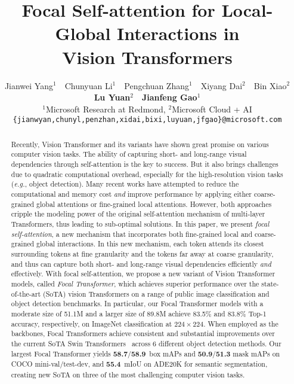 \documentclass{article}
\title{Focal Self-attention for Local-Global Interactions in \\ Vision Transformers}
\author{Jianwei Yang$^{1}$ \,\, Chunyuan Li$^{1}$ \,\, Pengchuan Zhang$^{1}$ \,\, Xiyang Dai$^{2}$ \,\, Bin Xiao$^{2}$ \\ 
  \textbf{Lu Yuan}$^{2}$ \,\, \textbf{Jianfeng Gao}$^{1}$ \\
  $^1$Microsoft Research at Redmond, $^2$Microsoft Cloud + AI\\
  \texttt{\{jianwyan,chunyl,penzhan,xidai,bixi,luyuan,jfgao\}@microsoft.com} \\
}
\newcommand{\cocominivalboxmapms}{\textbf{58.7}}
\newcommand{\cocotestdevboxmapms}{\textbf{58.9}}
\newcommand{\adevalms}{\textbf{55.4}}
\begin{document}
\maketitle

\begin{abstract}
    Recently, Vision Transformer and its variants have shown great promise on various computer vision tasks. The ability of capturing short- and long-range visual dependencies through self-attention is  the key to success. But it also brings challenges due to quadratic computational overhead, especially for the high-resolution vision tasks (\textit{e.g.}, object detection). Many recent works have attempted to reduce the computational and memory cost \emph{and} improve performance by applying either coarse-grained global attentions or fine-grained local attentions. However, both approaches cripple the modeling power of the original self-attention mechanism of multi-layer Transformers, thus leading to sub-optimal solutions. In this paper, we present \emph{focal self-attention}, a new mechanism that incorporates both fine-grained local and coarse-grained global interactions. In this new mechanism, each token attends its closest surrounding tokens at fine granularity and the tokens far away at coarse granularity, and thus can capture both short- and long-range visual dependencies efficiently \textit{and} effectively. With focal self-attention, we propose a new variant of Vision Transformer models, called \emph{Focal Transformer}, which achieves superior performance over the state-of-the-art (SoTA) vision Transformers on a range of public image classification and object detection benchmarks. In particular, our Focal Transformer models with a moderate size of 51.1M and a larger size of 89.8M achieve 83.5\% and 83.8\% Top-1 accuracy, respectively, on ImageNet classification at $224 \times 224$. When employed as the backbones, Focal Transformers achieve consistent and substantial improvements over the current SoTA Swin Transformers~\cite{liu2021swin} across 6 different object detection methods. Our largest Focal Transformer yields \cocominivalboxmapms/\cocotestdevboxmapms~box mAPs and \textbf{50.9}/\textbf{51.3} mask mAPs on COCO mini-val/test-dev, and \adevalms~mIoU on ADE20K for semantic segmentation, creating new SoTA on three of the most challenging computer vision tasks.


  
\end{abstract}
\end{document}

